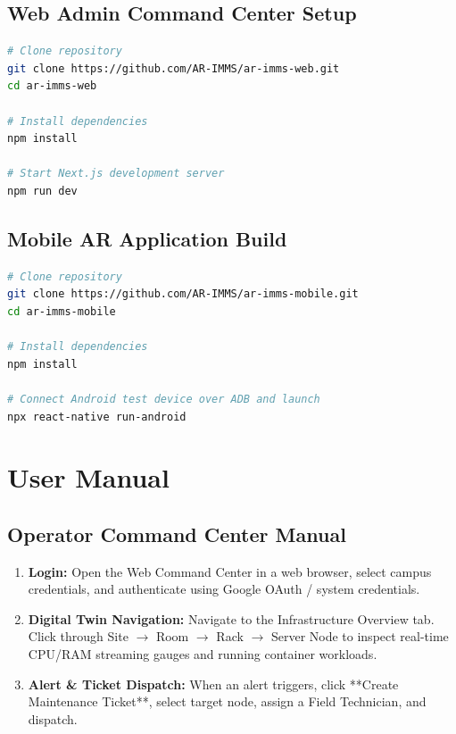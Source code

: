 \subsection{Web Admin Command Center Setup}
\begin{lstlisting}[language=bash, caption=Next.js Web Admin Portal Installation Commands]
# Clone repository
git clone https://github.com/AR-IMMS/ar-imms-web.git
cd ar-imms-web

# Install dependencies
npm install

# Start Next.js development server
npm run dev
\end{lstlisting}

\subsection{Mobile AR Application Build}
\begin{lstlisting}[language=bash, caption=React Native AR Application Build Commands]
# Clone repository
git clone https://github.com/AR-IMMS/ar-imms-mobile.git
cd ar-imms-mobile

# Install dependencies
npm install

# Connect Android test device over ADB and launch
npx react-native run-android
\end{lstlisting}

\section{User Manual}

\subsection{Operator Command Center Manual}
\begin{enumerate}
    \item \textbf{Login:} Open the Web Command Center in a web browser, select campus credentials, and authenticate using Google OAuth / system credentials.
    \item \textbf{Digital Twin Navigation:} Navigate to the Infrastructure Overview tab. Click through Site $\rightarrow$ Room $\rightarrow$ Rack $\rightarrow$ Server Node to inspect real-time CPU/RAM streaming gauges and running container workloads.
    \item \textbf{Alert \& Ticket Dispatch:} When an alert triggers, click **Create Maintenance Ticket**, select target node, assign a Field Technician, and dispatch.
\end{enumerate}

